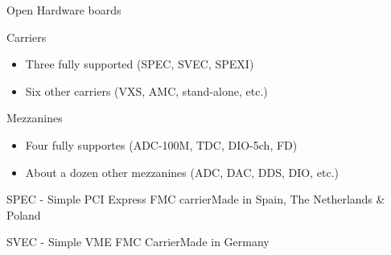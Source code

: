 \documentclass[compress,red]{beamer}
\begin{document}
\begin{frame}{Open Hardware boards}

  \begin{block}{Carriers}
    \begin{itemize}
    \item Three fully supported (SPEC, SVEC, SPEXI)
    \item Six other carriers (VXS, AMC, stand-alone, etc.)
    \end{itemize}
  \end{block}


  \begin{block}{Mezzanines}
    \begin{itemize}
    \item Four fully supportes (ADC-100M, TDC, DIO-5ch, FD)
    \item About a dozen other mezzanines (ADC, DAC, DDS, DIO, etc.)
    \end{itemize}
  \end{block}


\end{frame}

\begin{frame}{SPEC - Simple PCI Express FMC carrier}{Made in Spain, The Netherlands \& Poland}

  \begin{center}
  \end{center}

\end{frame}

\begin{frame}{SVEC - Simple VME FMC Carrier}{Made in Germany}

  \begin{center}
  \end{center}

\end{frame}
\end{document}
